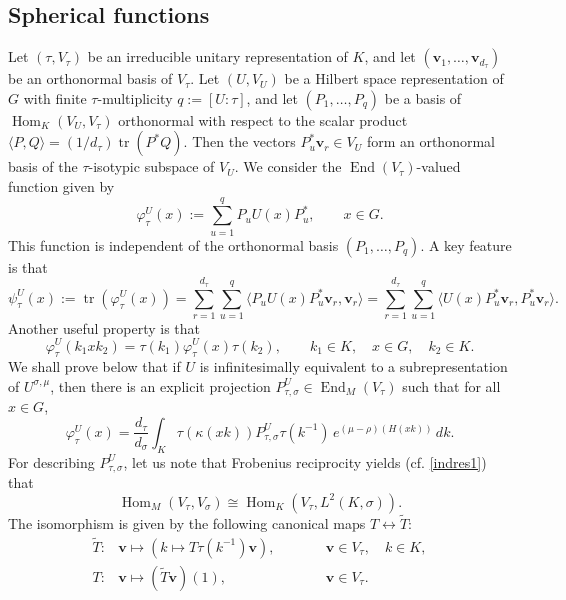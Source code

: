\documentclass[11pt,oneside]{amsart}
\numberwithin{equation}{section}
\theoremstyle{remark}
\theoremstyle{plain}
\DeclareMathOperator{\tr}{tr}
\DeclareMathOperator{\Hom}{Hom}
\DeclareMathOperator{\End}{End}
\newcommand{\bv}{\mathbf{v}}
\begin{document}
\subsection{Spherical functions}
Let $(\tau,V_\tau)$ be an irreducible unitary representation of $K$, and let $(\bv_1,\dotsc,\bv_{d_\tau})$ be an orthonormal basis of $V_\tau$. Let $(U,V_U)$ be a Hilbert space representation of $G$ with finite $\tau$-multiplicity $q:=[U:\tau]$,
and let $(P_1,\dotsc,P_q)$ be a basis of $\Hom_K(V_U,V_\tau)$ orthonormal with respect to the scalar product $\langle P,Q\rangle=(1/d_\tau)\tr(P^*Q)$. Then the vectors $P_u^*\bv_r\in V_U$ form an orthonormal basis of the $\tau$-isotypic subspace of $V_U$. We consider the $\End(V_\tau)$-valued function given by
\[\varphi_\tau^U(x):=\sum_{u=1}^{q} P_u U(x)P_u^*,\qquad x\in G.\]
This function is independent of the orthonormal basis $(P_1,\dotsc,P_q)$. A key feature is that
\begin{equation}\label{eq:psi-expanded-in-P-basis}
\psi_\tau^U(x) := \tr(\varphi_\tau^U(x))
=\sum_{r=1}^{d_\tau}\sum_{u=1}^q\langle P_uU(x)P_u^*\bv_r,\bv_r\rangle
=\sum_{r=1}^{d_\tau}\sum_{u=1}^q\langle U(x)P_u^*\bv_r,P_u^*\bv_r\rangle.
\end{equation}
Another useful property is that
\begin{equation}\label{varphisymmetry}
\varphi_{\tau}^U(k_1xk_2)=\tau(k_1)\varphi_{\tau}^U(x)\tau(k_2),
\qquad k_1\in K,\quad x\in G,\quad k_2\in K.
\end{equation}
We shall prove below that if $U$ is infinitesimally equivalent to a subrepresentation of $U^{\sigma,\mu}$, then there is an explicit projection $P_{\tau,\sigma}^U\in\End_M(V_\tau)$ such that for all $x\in G$,
\begin{equation}\label{varphi1}
\varphi_\tau^U(x)=\frac{d_\tau}{d_\sigma}\int_K\tau(\kappa(xk))P_{\tau,\sigma}^U\tau(k^{-1})\,e^{(\mu-\rho)(H(xk))}\,dk.
\end{equation}
For describing $P_{\tau,\sigma}^U$, let us note that Frobenius reciprocity yields (cf. \eqref{indres1}) that
\begin{equation}\label{frobenius}
\Hom_M(V_\tau,V_\sigma)\cong\Hom_K(V_\tau,L^2(K,\sigma)).
\end{equation}
The isomorphism is given by the following canonical maps $T\leftrightarrow\widetilde T$:
\[\begin{alignedat}{2}
\widetilde T:&\bv\mapsto(k\mapsto T\tau(k^{-1})\bv),&\qquad &\bv\in V_\tau,\quad k\in K,\\
T:&\bv\mapsto(\widetilde T\bv)(1),&\qquad&\bv\in V_\tau.
\end{alignedat}\]
\end{document}
